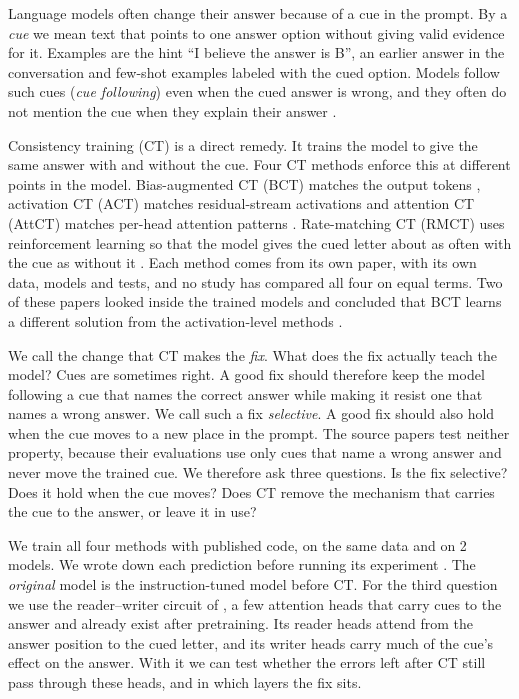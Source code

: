 \documentclass[11pt]{article}
\begin{document}
Language models often change their answer because of a cue in the prompt. By a \emph{cue} we mean text that points to one answer option without giving valid evidence for it. Examples are the hint ``I believe the answer is B'', an earlier answer in the conversation and few-shot examples labeled with the cued option. Models follow such cues (\emph{cue following}) even when the cued answer is wrong, and they often do not mention the cue when they explain their answer \citep{sharma2024sycophancy,turpin2023language,chua2024bct}.

Consistency training (CT) is a direct remedy. It trains the model to give the same answer with and without the cue. Four CT methods enforce this at different points in the model. Bias-augmented CT (BCT) matches the output tokens \citep{chua2024bct}, activation CT (ACT) matches residual-stream activations \citep{irpan2025consistency} and attention CT (AttCT) matches per-head attention patterns \citep{gautam2026stack}. Rate-matching CT (RMCT) uses reinforcement learning so that the model gives the cued letter about as often with the cue as without it \citep{imran2026ratematching}. Each method comes from its own paper, with its own data, models and tests, and no study has compared all four on equal terms. Two of these papers looked inside the trained models and concluded that BCT learns a different solution from the activation-level methods \citep{irpan2025consistency,gautam2026stack}.

We call the change that CT makes the \emph{fix}. What does the fix actually teach the model? Cues are sometimes right. A good fix should therefore keep the model following a cue that names the correct answer while making it resist one that names a wrong answer. We call such a fix \emph{selective}. A good fix should also hold when the cue moves to a new place in the prompt. The source papers test neither property, because their evaluations use only cues that name a wrong answer and never move the trained cue. We therefore ask three questions. Is the fix selective? Does it hold when the cue moves? Does CT remove the mechanism that carries the cue to the answer, or leave it in use?

We train all four methods with published code, on the same data and on 2 models. We wrote down each prediction before running its experiment \citep{van-miltenburg-etal-2021-preregistering}. The \emph{original} model is the instruction-tuned model before CT. For the third question we use the reader--writer circuit of \citet{gupta2026many}, a few attention heads that carry cues to the answer and already exist after pretraining. Its reader heads attend from the answer position to the cued letter, and its writer heads carry much of the cue's effect on the answer. With it we can test whether the errors left after CT still pass through these heads, and in which layers the fix sits.
\end{document}
